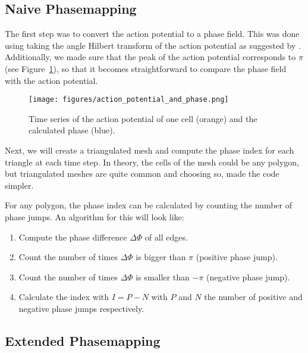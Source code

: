 \documentclass[twocolumn]{article}
\begin{document}
\subsection{Naive Phasemapping}\label{naive-phasemapping}

The first step was to convert the action potential to a phase field.
This was done using taking the angle Hilbert transform of the action
potential as suggested by \autocite{bray2002considerations}. Additionally,
we made sure that the peak of the action potential corresponds to
\(\pi\) (see Figure~\ref{fig:action_potential_and_phase}),
so that it becomes straightforward to compare the phase field with
the action potential.

\begin{figure}[ht]
  \begin{center}
    \texttt{[image: figures/action\_potential\_and\_phase.png]}
  \end{center}
  \caption{
    Time series of the action potential of one cell (orange)
    and the calculated phase (blue).
  }\label{fig:action_potential_and_phase}
\end{figure}

Next, we will create a triangulated mesh and compute the phase index for
each triangle at each time step. In theory, the cells of the mesh could
be any polygon, but triangulated meshes are quite common and choosing
so, made the code simpler.

For any polygon, the phase index can be calculated by counting the
number of phase jumps. An algorithm for this will look like:

\begin{enumerate}
    \def\labelenumi{\arabic{enumi}.}
    \tightlist
  \item
    Compute the phase difference \(\Delta\Phi\) of all edges.
  \item
    Count the number of times \(\Delta\Phi\) is bigger than \(\pi\)
    (positive phase jump).
  \item
    Count the number of times \(\Delta\Phi\) is smaller than \(-\pi\)
    (negative phase jump).
  \item
    Calculate the index with \(I = P - N\) with \(P\) and \(N\) the number
    of positive and negative phase jumps respectively.
\end{enumerate}

\subsection{Extended Phasemapping}\label{extended-phasemapping}
\end{document}
